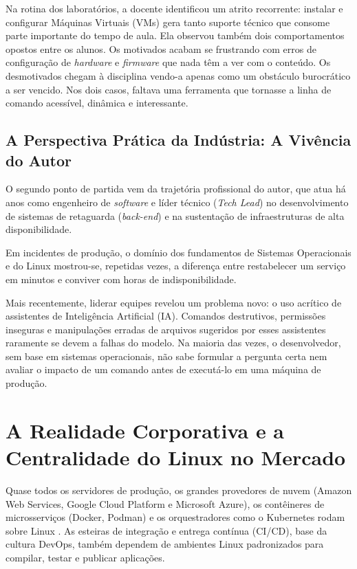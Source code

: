 Na rotina dos laboratórios, a docente identificou um atrito recorrente: instalar e configurar Máquinas Virtuais (VMs) gera tanto suporte técnico que consome parte importante do tempo de aula. Ela observou também dois comportamentos opostos entre os alunos. Os motivados acabam se frustrando com erros de configuração de \textit{hardware} e \textit{firmware} que nada têm a ver com o conteúdo. Os desmotivados chegam à disciplina vendo-a apenas como um obstáculo burocrático a ser vencido. Nos dois casos, faltava uma ferramenta que tornasse a linha de comando acessível, dinâmica e interessante.

\subsection{A Perspectiva Prática da Indústria: A Vivência do Autor}
O segundo ponto de partida vem da trajetória profissional do autor, que atua há anos como engenheiro de \textit{software} e líder técnico (\textit{Tech Lead}) no desenvolvimento de sistemas de retaguarda (\textit{back-end}) e na sustentação de infraestruturas de alta disponibilidade.

Em incidentes de produção, o domínio dos fundamentos de Sistemas Operacionais e do Linux mostrou-se, repetidas vezes, a diferença entre restabelecer um serviço em minutos e conviver com horas de indisponibilidade.

Mais recentemente, liderar equipes revelou um problema novo: o uso acrítico de assistentes de Inteligência Artificial (IA). Comandos destrutivos, permissões inseguras e manipulações erradas de arquivos sugeridos por esses assistentes raramente se devem a falhas do modelo. Na maioria das vezes, o desenvolvedor, sem base em sistemas operacionais, não sabe formular a pergunta certa nem avaliar o impacto de um comando antes de executá-lo em uma máquina de produção.

\section{A Realidade Corporativa e a Centralidade do Linux no Mercado}
\label{sec:realidade-mercado}

Quase todos os servidores de produção, os grandes provedores de nuvem (Amazon Web Services, Google Cloud Platform e Microsoft Azure), os contêineres de microsserviços (Docker, Podman) e os orquestradores como o Kubernetes rodam sobre Linux \cite{nemeth2017unix}. As esteiras de integração e entrega contínua (CI/CD), base da cultura DevOps, também dependem de ambientes Linux padronizados para compilar, testar e publicar aplicações.

